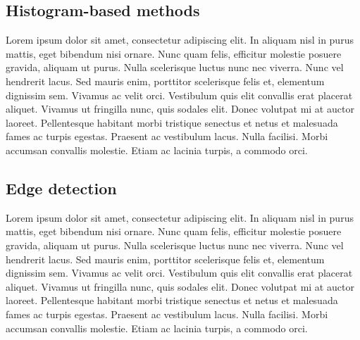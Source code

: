\subsection{Histogram-based methods}\label{sec:3.3.4}
\vspace{-0.5cm}
\noindent  Lorem ipsum dolor sit amet, consectetur adipiscing elit. In aliquam nisl in purus mattis, eget bibendum nisi ornare. Nunc quam felis, efficitur molestie posuere gravida, aliquam ut purus. Nulla scelerisque luctus nunc nec viverra. Nunc vel hendrerit lacus. Sed mauris enim, porttitor scelerisque felis et, elementum dignissim sem. Vivamus ac velit orci. Vestibulum quis elit convallis erat placerat aliquet. Vivamus ut fringilla nunc, quis sodales elit. Donec volutpat mi at auctor laoreet. Pellentesque habitant morbi tristique senectus et netus et malesuada fames ac turpis egestas. Praesent ac vestibulum lacus. Nulla facilisi. Morbi accumsan convallis molestie. Etiam ac lacinia turpis, a commodo orci.

\vspace{-0.3cm}

\subsection{Edge detection}\label{sec:3.3.5}
\vspace{-0.5cm}
\noindent  Lorem ipsum dolor sit amet, consectetur adipiscing elit. In aliquam nisl in purus mattis, eget bibendum nisi ornare. Nunc quam felis, efficitur molestie posuere gravida, aliquam ut purus. Nulla scelerisque luctus nunc nec viverra. Nunc vel hendrerit lacus. Sed mauris enim, porttitor scelerisque felis et, elementum dignissim sem. Vivamus ac velit orci. Vestibulum quis elit convallis erat placerat aliquet. Vivamus ut fringilla nunc, quis sodales elit. Donec volutpat mi at auctor laoreet. Pellentesque habitant morbi tristique senectus et netus et malesuada fames ac turpis egestas. Praesent ac vestibulum lacus. Nulla facilisi. Morbi accumsan convallis molestie. Etiam ac lacinia turpis, a commodo orci.


\vspace{-0.3cm}

